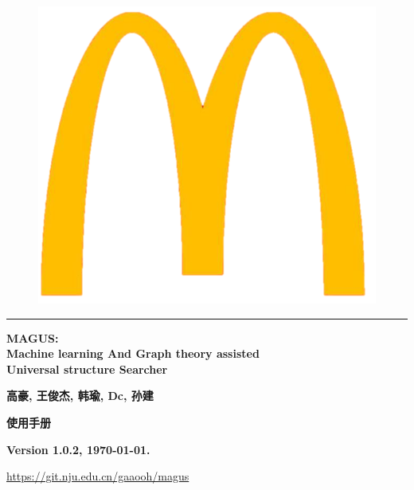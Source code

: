 \documentclass[12pt]{article}
\begin{document}

\begin{titlepage}

\begin{center}

\vspace{2.0cm}
\begin{figure}[hbtp]
\centering
\includegraphics[scale=0.2]{pic/temp_logo.png}
\end{figure}
\vspace{0.5cm}
\hrule
\vspace{1.5cm}

\textbf{ 
\Large MAGUS: \vspace{0.7cm} \\
Machine learning And Graph theory assisted \vspace{0.5cm} \\
Universal structure Searcher}
\vspace{1.5cm}

\textbf{高豪, 王俊杰, 韩瑜, Dc, 孙建}

\vspace{0.5cm}

\vspace{2.0cm}

\textbf{\Large 使用手册}

\textbf{Version 1.0.2, \today.}

\vspace{2.0cm}

\textcolor{blue}{\url{https://git.nju.edu.cn/gaaooh/magus}}

\end{center}

\vspace{1.0cm}

\end{titlepage}
\end{document}
